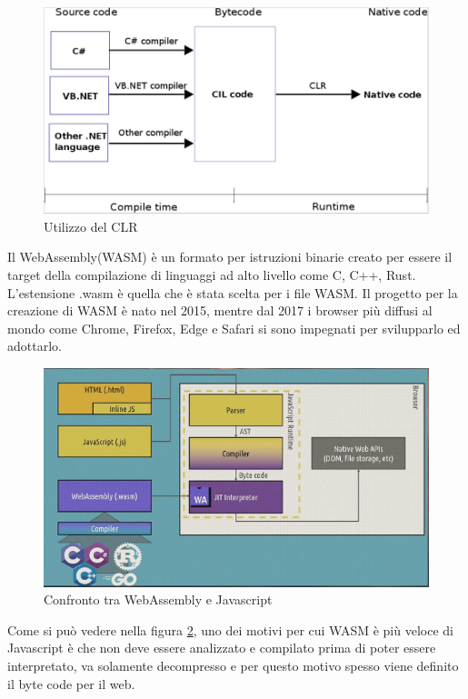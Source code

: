 \begin{figure}[H]
	\centerline{\includegraphics[scale=0.5]{figure/CLR.PNG}}
	\caption{Utilizzo del CLR}
	\label{fig:CLR}
\end{figure}

Il WebAssembly(WASM) \`e un formato per istruzioni binarie creato per essere il target della compilazione di linguaggi ad alto livello come C, C++, Rust\cite{webAssemblyOfficialWebsite}.
L'estensione .wasm \`e quella che \`e stata scelta per i file WASM.
Il progetto per la creazione di WASM \`e nato nel 2015, mentre dal 2017 i browser pi\`u diffusi al mondo come Chrome, Firefox, Edge e Safari si sono impegnati per svilupparlo ed adottarlo\cite{webAssemblySupport}.

\begin{figure}[H]
	\centerline{\includegraphics[scale=0.7]{figure/WasmVSJavascript.PNG}}
	\caption{Confronto tra WebAssembly e Javascript}
	\label{fig:WasmVSJavascript}
\end{figure}

Come si pu\`o vedere nella figura \ref{fig:WasmVSJavascript}, uno dei motivi per cui WASM \`e pi\`u veloce di Javascript \`e che non deve essere analizzato e compilato prima di poter essere interpretato, va solamente decompresso e per questo motivo spesso viene definito il byte code per il web.

